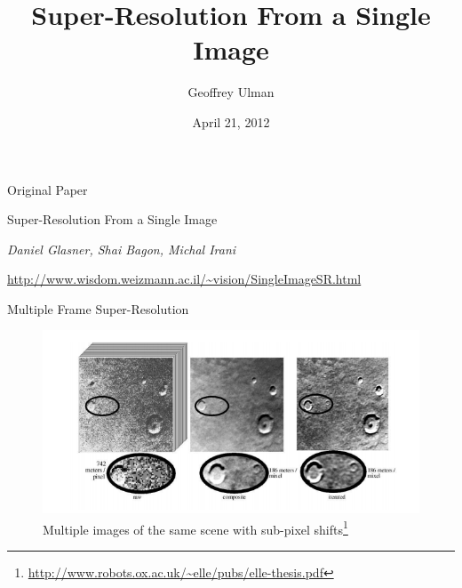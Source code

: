 \documentclass{beamer}
\title{Super-Resolution From a Single Image}
\author{Geoffrey Ulman}
\date{April 21, 2012}
\begin{document}

\begin{frame}
\titlepage
\end{frame}


\begin{frame}{Original Paper}

Super-Resolution From a Single Image

\vspace{1cm}

\emph{Daniel Glasner, Shai Bagon, Michal Irani}

\vspace{1cm}

\url{http://www.wisdom.weizmann.ac.il/~vision/SingleImageSR.html}

\end{frame}


\begin{frame}{Multiple Frame Super-Resolution}

\begin{figure}
\centering
\includegraphics[width=1.0\textwidth]{presentation_screen1.png}
\caption{Multiple images of the same scene with sub-pixel shifts\footnote[1]{\url{http://www.robots.ox.ac.uk/~elle/pubs/elle-thesis.pdf}}}
\end{figure}

\end{frame}


\end{document}
